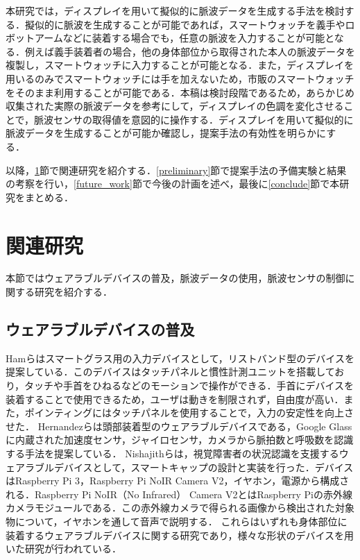 \documentclass[submit,techrep]{ipsj}
\begin{document}
本研究では，ディスプレイを用いて擬似的に脈波データを生成する手法を検討する．擬似的に脈波を生成することが可能であれば，スマートウォッチを義手やロボットアームなどに装着する場合でも，任意の脈波を入力することが可能となる．例えば義手装着者の場合，他の身体部位から取得された本人の脈波データを複製し，スマートウォッチに入力することが可能となる．また，ディスプレイを用いるのみでスマートウォッチには手を加えないため，市販のスマートウォッチをそのまま利用することが可能である．本稿は検討段階であるため，あらかじめ収集された実際の脈波データを参考にして，ディスプレイの色調を変化させることで，脈波センサの取得値を意図的に操作する．ディスプレイを用いて擬似的に脈波データを生成することが可能か確認し，提案手法の有効性を明らかにする．
\par

以降，\ref{related}節で関連研究を紹介する．\ref{preliminary}節で提案手法の予備実験と結果の考察を行い，\ref{future_work}節で今後の計画を述べ，最後に\ref{conclude}節で本研究をまとめる．





\section{関連研究}
\label{related}
本節ではウェアラブルデバイスの普及，脈波データの使用，脈波センサの制御に関する研究を紹介する．

\subsection{ウェアラブルデバイスの普及}
Hamら\cite{smart_wristband}はスマートグラス用の入力デバイスとして，リストバンド型のデバイスを提案している．このデバイスはタッチパネルと慣性計測ユニットを搭載しており，タッチや手首をひねるなどのモーションで操作ができる．手首にデバイスを装着することで使用できるため，ユーザは動きを制限されず，自由度が高い．また，ポインティングにはタッチパネルを使用することで，入力の安定性を向上させた．
Hernandezら\cite{bioglass}は頭部装着型のウェアラブルデバイスである，Google Glassに内蔵された加速度センサ，ジャイロセンサ，カメラから脈拍数と呼吸数を認識する手法を提案している．
Nishajithら\cite{smart_cap}は，視覚障害者の状況認識を支援するウェアラブルデバイスとして，スマートキャップの設計と実装を行った．デバイスはRaspberry Pi 3，Raspberry Pi NoIR Camera V2，イヤホン，電源から構成される．Raspberry Pi NoIR（No Infrared） Camera V2とはRaspberry Piの赤外線カメラモジュールである．この赤外線カメラで得られる画像から検出された対象物について，イヤホンを通して音声で説明する．
これらはいずれも身体部位に装着するウェアラブルデバイスに関する研究であり，様々な形状のデバイスを用いた研究が行われている．
\par
\end{document}
